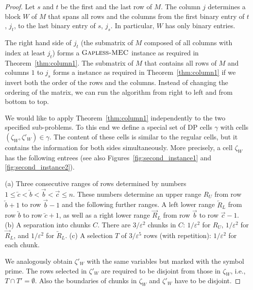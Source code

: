 \begin{proof}
    Let $s$ and $t$ be the first and the last row of $M$.
    The column $j$ determines a block $W$ of $M$ that spans all rows and the columns from the first binary entry of $t$, $j_t$, to the last binary entry of $s$, $j_s$.
    In particular, $W$ has only binary entries.

    The right hand side of $j_t$ (the submatrix of $M$ composed of all columns with index at least $j_t$) forms a $\textsc{Gapless-MEC}$ instance as required in Theorem~\ref{thm:column1}.
    The submatrix of $M$ that contains all rows of $M$ and columns $1$ to $j_s$ forms a \GMEC instance as required in Theorem~\ref{thm:column1} if we invert both the order of the rows and the columns.
    Instead of changing the ordering of the matrix, we can run the algorithm from right to left and from bottom to top.

    We would like to apply Theorem~\ref{thm:column1} independently to the two specified sub-problems.
    To this end we define a special set of DP cells $\gamma$ with cells $(\zeta_W,\zeta'_W) \in \gamma$.
    The content of these cells is similar to the regular cells, but it contains the information for both sides simultaneously.
    More precisely, a cell $\zeta_W$ has the following entrees (see also Figures~\ref{fig:second_instance1} and \ref{fig:second_instance2}).

    (a) Three consecutive ranges of rows determined by numbers $1\le \overleftarrow{c} < \overleftarrow{b} < \overrightarrow{b} < \overrightarrow{c} \le n$.
    These numbers determine an upper range $R_U$ from row $\overleftarrow{b}+1$ to row $\overrightarrow{b}-1$ and the following further ranges.
    A left lower range $\overleftarrow{R}_L$ from row $\overleftarrow{b}$ to row $\overleftarrow{c}+1$,
    as well as a right lower range $\overrightarrow{R}_L$ from row $\overrightarrow{b}$ to row $\overrightarrow{c}-1$.
    (b) A separation into chunks $C$. There are $3/\varepsilon^2$ chunks in $C$: $1/\varepsilon^2$ for $R_U$,  $1/\varepsilon^2$ for $\overrightarrow{R}_L$, and  $1/\varepsilon^2$ for $\overleftarrow{R}_L$.
    (c) A selection $T$ of $3/\varepsilon^5$ rows (with repetition): $1/\varepsilon^2$ for each chunk.

    We analogously obtain $\zeta'_W$ with the same variables but marked with the symbol prime.
    The rows selected in $\zeta'_W$ are required to be disjoint from those in $\zeta_W$, i.e., $T \cap T' = \emptyset$.
    Also the boundaries of chunks in $\zeta_W$ and $\zeta'_W$ have to be disjoint.


\end{proof}
